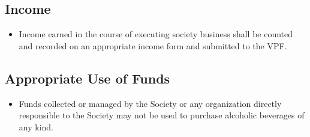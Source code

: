 \subsection{Income}
\begin{itemize}
\item Income earned in the course of executing society business shall be counted and recorded on an appropriate income form and submitted to the VPF.
\end{itemize}

\subsection{Appropriate Use of Funds}
\begin{itemize}
\item Funds collected or managed by the Society or any organization directly responsible to the Society may not be used to purchase alcoholic beverages of any kind.
\end{itemize}